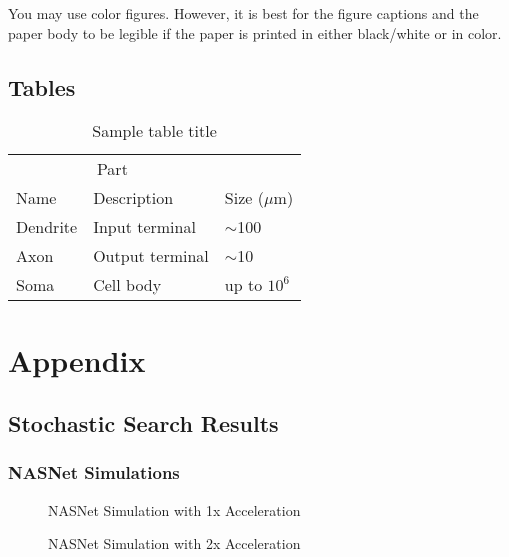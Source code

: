 \documentclass[twocolumn]{article}
\begin{document}
You may use color figures.  However, it is best for the figure captions and the
paper body to be legible if the paper is printed in either black/white or in
color.

\subsection{Tables}



\begin{table}
  \caption{Sample table title}
  \label{sample-table}
  \centering
  \begin{tabular}{lll}
    \toprule
    \multicolumn{2}{c}{Part}                   \\
    \cmidrule(r){1-2}
    Name     & Description     & Size ($\mu$m) \\
    \midrule
    Dendrite & Input terminal  & $\sim$100     \\
    Axon     & Output terminal & $\sim$10      \\
    Soma     & Cell body       & up to $10^6$  \\
    \bottomrule
  \end{tabular}
\end{table}



\FloatBarrier
\clearpage
\onecolumn
\appendix
\section{Appendix}
\subsection{Stochastic Search Results}
\subsubsection{NASNet Simulations}
\begin{figure}[!h]
    \begin{center}
        
    \end{center}
    \caption{NASNet Simulation with 1x Acceleration}
    \label{fig:nasnet_1x_acceleration}
\end{figure}
\begin{figure}
    \begin{center}
        
    \end{center}
    \caption{NASNet Simulation with 2x Acceleration}
    \label{fig:nasnet_2x_acceleration}
\end{figure}
\end{document}

